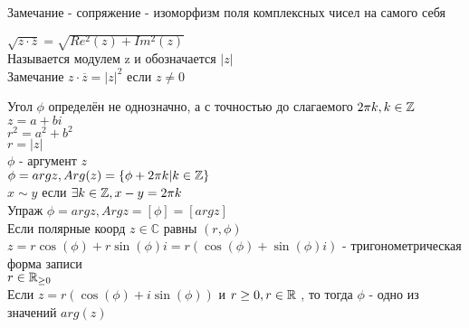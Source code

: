 Замечание - сопряжение - изоморфизм поля комплексных чисел на самого себя\\
\begin{definition}
	$ \sqrt{z \cdot \overline{z} } = \sqrt{Re^2(z) + Im^2 (z) } $ \\
	Называется модулем z и обозначается $ |z| $ \\
	Замечание $ z \cdot \overline{z} = |z|^2$ если $ z \neq 0 $\\
\end{definition}


Угол $ \phi $ определён не однозначно, а с точностью до слагаемого $ 2 \pi k, k \in \mathbb{Z} $\\
$ z = a + bi $\\
$ r^2 = a^2 + b^2 $ \\
$ r = |z| $ \\
$ \phi $ - аргумент $z$\\
$ \phi = arg z, Arg(z) = \{ \phi + 2 \pi k | k \in \mathbb{Z} \} $\\
$ x \sim y $ если $ \exists k \in \mathbb{Z} , x-y=2\pi k$ \\
Упраж
$ \phi = arg z, Arg z = [ \phi ] = [arg z] $\\

Если полярные коорд $ z \in \mathbb{C} $ равны $ (r, \phi) $ \\
$ z = r \cos(\phi) + r \sin (\phi ) i = r (\cos(\phi) + \sin(\phi) i ) $ - тригонометрическая форма записи\\
$ r \in \mathbb{R}_{\geq 0} $ \\
Если $ z = r(\cos(\phi) + i \sin(\phi) ) $ и $ r \geq 0, r \in \mathbb{R} $ , то тогда $\phi$ - одно из значений $arg(z)$ \\

